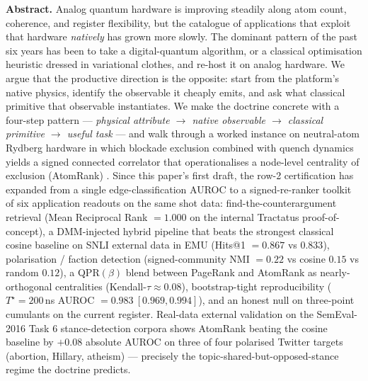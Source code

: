 \documentclass[10pt]{article}
\begin{document}
\begin{center}
  \begin{minipage}{0.88\textwidth}
    {\small
      \textbf{Abstract.}
      Analog quantum hardware is improving steadily along atom count, coherence, and register flexibility, but the catalogue of applications that exploit that hardware \emph{natively} has grown more slowly. The dominant pattern of the past six years has been to take a digital-quantum algorithm, or a classical optimisation heuristic dressed in variational clothes, and re-host it on analog hardware. We argue that the productive direction is the opposite: start from the platform's native physics, identify the observable it cheaply emits, and ask what classical primitive that observable instantiates. We make the doctrine concrete with a four-step pattern --- \emph{physical attribute $\to$ native observable $\to$ classical primitive $\to$ useful task} --- and walk through a worked instance on neutral-atom Rydberg hardware in which blockade exclusion combined with quench dynamics yields a signed connected correlator that operationalises a node-level centrality of exclusion (AtomRank) \cite{jurczak2026atomrank}. Since this paper's first draft, the row-2 certification has expanded from a single edge-classification AUROC to a signed-re-ranker toolkit of six application readouts on the same shot data: find-the-counterargument retrieval (Mean Reciprocal Rank $= 1.000$ on the internal Tractatus proof-of-concept), a DMM-injected hybrid pipeline that beats the strongest classical cosine baseline on SNLI external data in EMU (Hits@1 $= 0.867$ vs $0.833$), polarisation / faction detection (signed-community NMI $= 0.22$ vs cosine $0.15$ vs random $0.12$), a QPR$(\beta)$ blend between PageRank and AtomRank as nearly-orthogonal centralities (Kendall-$\tau \approx 0.08$), bootstrap-tight reproducibility ($T^\star = 200\,$ns AUROC $= 0.983\ [0.969, 0.994]$), and an honest null on three-point cumulants on the current register. Real-data external validation on the SemEval-2016 Task 6 stance-detection corpora shows AtomRank beating the cosine baseline by $+0.08$ absolute AUROC on three of four polarised Twitter targets (abortion, Hillary, atheism) --- precisely the topic-shared-but-opposed-stance regime the doctrine predicts.

}
\end{minipage}
\end{center}
\end{document}
